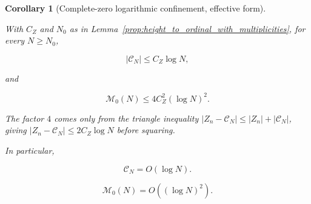 \documentclass[11pt]{amsart}
\numberwithin{equation}{section}
\theoremstyle{plain}
\newtheorem{corollary}[theorem]{Corollary}
\theoremstyle{definition}
\theoremstyle{remark}
\begin{document}
\begin{corollary}[Complete-zero logarithmic confinement, effective form]
\label{cor:complete_zero_logarithmic_confinement}
\label{cor:calC_log_bound}
\label{thm:calM0_log_square_bound}

With \(C_Z\) and \(N_0\) as in
Lemma~\ref{prop:height_to_ordinal_with_multiplicities}, for every
\(N\ge N_0\),

\begin{equation}
|\mathcal C_N|\le C_Z\log N,
\label{eq:calC_log_bound_quantitative}
\end{equation}

and

\begin{equation}
\mathcal M_0(N)\le 4C_Z^2(\log N)^2.
\label{eq:calM0_log_square_bound_quantitative}
\end{equation}

The factor \(4\) comes only from the triangle inequality
\(|Z_n-\mathcal C_N|\le |Z_n|+|\mathcal C_N|\), giving
\(|Z_n-\mathcal C_N|\le2C_Z\log N\) before squaring.

In particular,

\begin{equation}
\mathcal C_N
=
O(\log N).
\label{eq:calC_log_bound_result}
\end{equation}

\begin{equation}
\mathcal M_0(N)
=
O\!\left((\log N)^2\right).
\label{eq:calM0_log_square_bound}
\end{equation}

\end{corollary}
\end{document}
